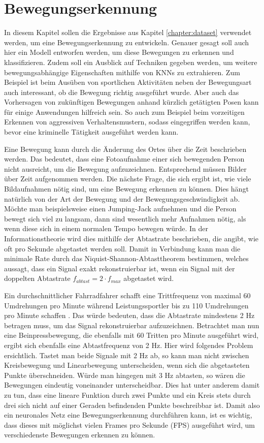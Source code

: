 \chapter{Bewegungserkennung}\label{chapter:motion-detection}
In diesem Kapitel sollen die Ergebnisse aus Kapitel \ref{chapter:dataset}
verwendet werden, um eine Bewegungserkennung zu entwickeln. Genauer gesagt soll
auch hier ein Modell entworfen werden, um diese Bewegungen zu erkennen und
klassifizieren. Zudem soll ein Ausblick auf Techniken gegeben werden, um weitere
bewegungsabhängige Eigenschaften mithilfe von KNNs zu extrahieren. Zum Beispiel
ist beim Ausüben von sportlichen Aktivitäten neben der Bewegungsart auch
interessant, ob die Bewegung richtig ausgeführt wurde. Aber auch das
Vorhersagen von zukünftigen Bewegungen anhand kürzlich getätigten Posen kann für
einige Anwendungen hilfreich sein. So auch zum Beispiel beim vorzeitigen
Erkennen von aggressiven Verhaltensmustern, sodass eingegriffen werden kann,
bevor eine kriminelle Tätigkeit ausgeführt werden kann. 

Eine Bewegung kann durch die Änderung des Ortes über die Zeit beschrieben
werden. Das bedeutet, dass eine Fotoaufnahme einer sich bewegenden Person nicht
ausreicht, um die Bewegung aufzuzeichnen. Entsprechend müssen Bilder über Zeit
aufgenommen werden. Die nächste Frage, die sich ergibt ist, wie viele
Bildaufnahmen nötig sind, um eine Bewegung erkennen zu können. Dies hängt
natürlich von der Art der Bewegung und der Bewegungsgeschwindigkeit ab. Möchte
man beispielsweise einen Jumping-Jack aufnehmen und die Person bewegt sich viel
zu langsam, dann sind wesentlich mehr Aufnahmen nötig, als wenn diese sich in
einem normalen Tempo bewegen würde. In der Informationstheorie wird dies
mithilfe der Abtastrate beschrieben, die angibt, wie oft pro Sekunde abgetastet
werden soll.  Damit in Verbindung kann man die minimale Rate durch das
Niquist-Shannon-Abtasttheorem bestimmen, welches aussagt, dass ein Signal exakt
rekonstruierbar ist, wenn ein Signal mit der doppelten Abtastrate $f_{abtast} =
2 \cdot f_{max}$ abgetastet wird.

Ein durchschnittlicher Fahrradfahrer schafft eine Trittfrequenz von maximal 60
Umdrehungen pro Minute während Leistungssportler bis zu 110 Umdrehungen pro
Minute schaffen \cite{smolik}. Das würde bedeuten, dass die Abtastrate
mindestens 2 Hz betragen muss, um das Signal rekonstruierbar aufzuzeichnen.
Betrachtet man nun eine Beinpressbewegung, die ebenfalls mit 60 Tritten pro
Minute ausgeführt wird, ergibt sich ebenfalls eine Abtastfrequenz von 2 Hz. Hier
wird folgendes Problem ersichtlich. Tastet man beide Signale mit 2 Hz ab, so
kann man nicht zwischen Kreisbewegung und Linearbewegung unterscheiden, wenn
sich die abgetasteten Punkte überschneiden. Würde man hingegen mit 3 Hz
abtasten, so wären die Bewegungen eindeutig voneinander unterscheidbar. Dies hat
unter anderem damit zu tun, dass eine lineare Funktion durch zwei Punkte und ein
Kreis stets durch drei sich nicht auf einer Geraden befindenden Punkte
beschreibbar ist. Damit also ein neuronales Netz eine Bewegungserkennung durchführen
kann, ist es wichtig, dass dieses mit möglichst vielen Frames pro Sekunde (FPS)
ausgeführt wird, um verschiedenste Bewegungen erkennen zu können.

